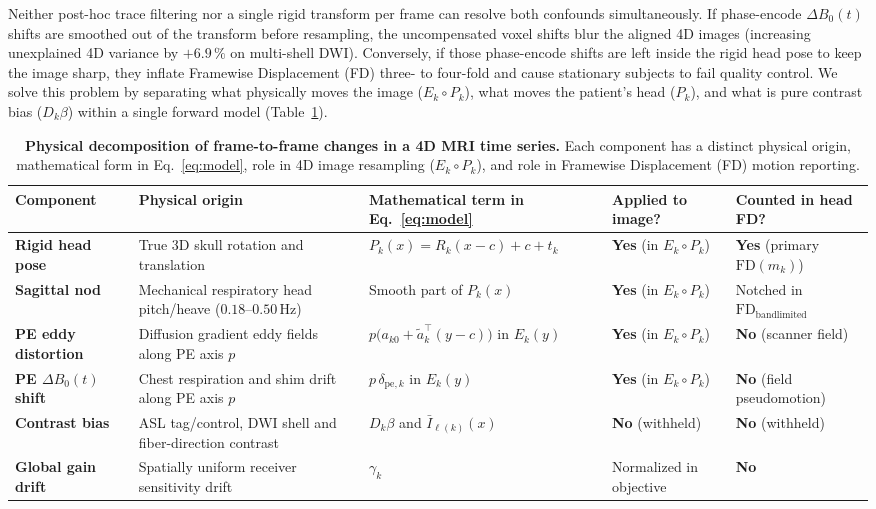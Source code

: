 \documentclass[11pt]{article}
\begin{document}
Neither post-hoc trace filtering nor a single rigid transform per frame can resolve both confounds simultaneously. If phase-encode $\Delta B_0(t)$ shifts are smoothed out of the transform before resampling, the uncompensated voxel shifts blur the aligned 4D images (increasing unexplained 4D variance by $+6.9\,\%$ on multi-shell DWI). Conversely, if those phase-encode shifts are left inside the rigid head pose to keep the image sharp, they inflate Framewise Displacement (FD) three- to four-fold and cause stationary subjects to fail quality control. We solve this problem by separating what physically moves the image ($E_k \circ P_k$), what moves the patient's head ($P_k$), and what is pure contrast bias ($D_k\beta$) within a single forward model (Table~\ref{tab:terms}).

\begin{table}[ht!]
\centering
\caption{\textbf{Physical decomposition of frame-to-frame changes in a 4D MRI time series.} Each component has a distinct physical origin, mathematical form in Eq.~\eqref{eq:model}, role in 4D image resampling ($E_k \circ P_k$), and role in Framewise Displacement (FD) motion reporting.}
\scriptsize
\setlength{\tabcolsep}{3.5pt}
\begin{tabular}{@{}>{\raggedright\arraybackslash}p{2.6cm}>{\raggedright\arraybackslash}p{4.3cm}>{\raggedright\arraybackslash}p{3.4cm}>{\raggedright\arraybackslash}p{2.7cm}>{\raggedright\arraybackslash}p{2.8cm}@{}}
\toprule
Component & Physical origin & Mathematical term in Eq.~\eqref{eq:model} & Applied to image? & Counted in head FD? \\
\midrule
\textbf{Rigid head pose} & True 3D skull rotation and translation & $P_k(x) = R_k(x-c)+c+t_k$ & \textbf{Yes} (in $E_k \circ P_k$) & \textbf{Yes} (primary $\text{FD}(m_k)$) \\
\textbf{Sagittal nod} & Mechanical respiratory head pitch/heave ($0.18\text{--}0.50$\,Hz) & Smooth part of $P_k(x)$ & \textbf{Yes} (in $E_k \circ P_k$) & Notched in $\text{FD}_{\text{bandlimited}}$ \\
\textbf{PE eddy distortion} & Diffusion gradient eddy fields along PE axis $p$ & $p\big(a_{k0} + \tilde a_k^\top(y-c)\big)$ in $E_k(y)$ & \textbf{Yes} (in $E_k \circ P_k$) & \textbf{No} (scanner field) \\
\textbf{PE $\Delta B_0(t)$ shift} & Chest respiration and shim drift along PE axis $p$ & $p\,\delta_{\text{pe},k}$ in $E_k(y)$ & \textbf{Yes} (in $E_k \circ P_k$) & \textbf{No} (field pseudomotion) \\
\textbf{Contrast bias} & ASL tag/control, DWI shell and fiber-direction contrast & $D_k\beta$ and $\bar I_{\ell(k)}(x)$ & \textbf{No} (withheld) & \textbf{No} (withheld) \\
\textbf{Global gain drift} & Spatially uniform receiver sensitivity drift & $\gamma_k$ & Normalized in objective & \textbf{No} \\
\bottomrule
\end{tabular}
\label{tab:terms}
\end{table}
\end{document}
